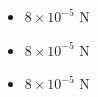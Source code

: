 \documentclass[12pt]{article}
\begin{document}
\begin{itemize}
\item $8 \times 10^{-5}$ N
\item $8 \times 10^{-5}$ N
\item $8 \times 10^{-5}$ N
\end{itemize}







%
\end{document}
